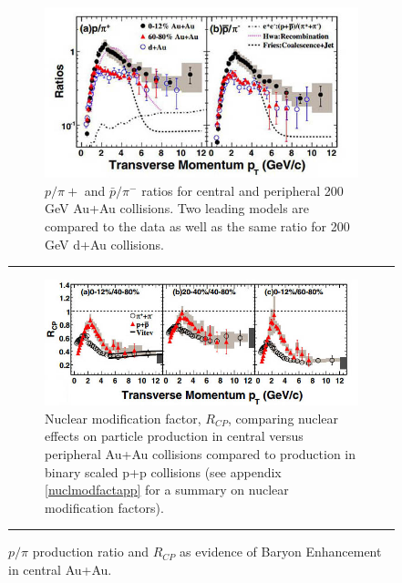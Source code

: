\begin{figure}
\centering    
\begin{subfigure}[b]{0.8\textwidth}
    \centering
    \includegraphics[width=\textwidth]{prevplots/ppiratiocentvsperiph.JPG}
    \caption{ $p/\pi{+}$ and $\bar{p}/\pi^{-}$ ratios for central and peripheral 200 GeV Au+Au collisions. Two leading models are compared to the data as well as the same ratio for 200 GeV d+Au collisions. \citep{PhysRevLett.97.152301}}
    \label{fig:ppiratiocentvsperiph}
\end{subfigure}
\rule{35em}{0.5pt}
\begin{subfigure}[b]{0.9\textwidth}
    \centering
    \includegraphics[width=\textwidth]{prevplots/Rcpcentvsperiph.jpg}
    \caption{Nuclear modification factor, $R_{CP}$, comparing nuclear effects on particle production in central versus peripheral Au+Au collisions compared to production in binary scaled p+p collisions (see appendix \ref{nuclmodfactapp} for a summary on nuclear modification factors). \citep{PhysRevLett.97.152301}}
    \label{fig:Rcpcentvsperiph}
\end{subfigure}
\rule{35em}{0.5pt}
\caption[Evidence of Baryon Enhancement in Au+Au collisions]{$p/\pi$ production ratio and $R_{CP}$ as evidence of Baryon Enhancement in central Au+Au.}
\label{fig:baryonenhancementAA}    
\end{figure}

